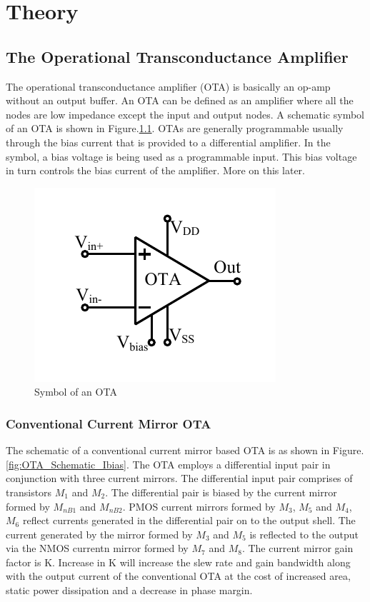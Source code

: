 \chapter{Theory}
\section{The Operational Transconductance Amplifier}
The operational transconductance amplifier (OTA) is basically an op-amp without an output buffer. An OTA can be defined as an amplifier where all the nodes are low impedance except the input and output nodes. A schematic symbol of an OTA is shown in Figure.\ref{fig:OTA_symbol}. OTAs are generally programmable usually through the bias current that is provided to a differential amplifier. In the symbol, a bias voltage is being used as a programmable input. This bias voltage in turn controls the bias current of the amplifier. More on this later.

\begin{figure} [H]
\centering
\includegraphics[scale=1]{Figures/System_Level/OTA_Symbol.pdf}
\caption{Symbol of an OTA}
\label{fig:OTA_symbol}
\end{figure}

\subsection{Conventional Current Mirror OTA}
The schematic of a conventional current mirror based OTA is as shown in Figure.\ref{fig:OTA_Schematic_Ibias}. The OTA employs a differential input pair in conjunction with three current mirrors. The differential input pair comprises of transistors $M_1$ and $M_2$. The differential pair is biased by the current mirror formed by $M_{nB1}$ and $M_{nB2}$. PMOS current mirrors formed by $M_3$, $M_5$ and $M_4$, $M_6$ reflect currents generated in the differential pair on to the output shell. The current generated by the mirror formed by $M_3$ and $M_5$ is reflected to the output via the NMOS currentn mirror formed by $M_7$ and $M_8$. The current mirror gain factor is K. Increase in K will increase the slew rate and gain bandwidth along with the output current of the conventional OTA at the cost of increased area, static power dissipation and a decrease in phase margin.

